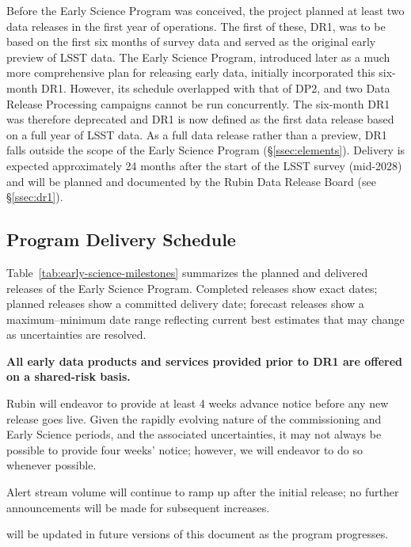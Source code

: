 Before the Early Science Program was conceived, the project planned at least two data releases in the first year of operations.
The first of these, DR1, was to be based on the first six months of survey data and served as the original early preview of LSST data.
The Early Science Program, introduced later as a much more comprehensive plan for releasing early data, initially incorporated this six-month DR1.
However, its schedule overlapped with that of DP2, and two Data Release Processing campaigns cannot be run concurrently.
The six-month DR1 was therefore deprecated and DR1 is now defined as the first data release based on a full year of LSST data.
As a full data release rather than a preview, DR1 falls outside the scope of the Early Science Program (\S\ref{ssec:elements}).
Delivery is expected approximately 24 months after the start of the LSST survey (mid-2028) and will be planned and documented by the Rubin Data Release Board (see \S\ref{ssec:dr1}).

\subsection{Program Delivery Schedule}
\label{ssec:schedule}
Table~\ref{tab:early-science-milestones} summarizes the planned and delivered releases of the Early Science Program.
Completed releases show exact dates; planned releases show a committed delivery date; forecast releases show a maximum--minimum date range reflecting current best estimates that may change as uncertainties are resolved.

\textbf{All early data products and services provided prior to DR1 are offered on a shared-risk basis.}



Rubin will endeavor to provide at least 4 weeks advance notice before any new release goes live.
Given the rapidly evolving nature of the commissioning and Early Science periods, and the associated uncertainties, it may not always be possible to provide four weeks' notice; however, we will endeavor to do so whenever possible.

Alert stream volume will continue to ramp up after the initial release; no further announcements will be made for subsequent increases.

 will be updated in future versions of this document as the program progresses.

